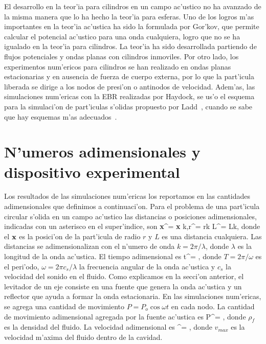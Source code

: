El desarrollo en la teor'ia para cilindros en un campo ac'ustico no ha avanzado de la misma manera
que lo ha hecho la teor'ia para esferas. Uno de los logros m'as importantes en la teor'ia ac'ustica
ha sido la formulada por Gor'kov, que permite calcular el potencial ac'ustico para una onda cualquiera, logro
que no se ha igualado en la teor'ia para cilindros. La  teor'ia ha sido desarrollada partiendo de
flujos potenciales y ondas planas con cilindros inmoviles. Por otro lado, 
los experimentos num'ericos para cilindros se han realizado
en ondas planas estacionarias y en ausencia de fuerza de cuerpo externa, por lo que la part'icula liberada
se dirige a los nodos de presi'on o antinodos de velocidad. Adem'as, las simulaciones num'ericas con la EBR
realizadas por Haydock, se us'o el esquema para la simulaci'on de part'iculas s'olidas propuesto por 
Ladd~\cite{ladd94,ladd94b}, cuando se sabe que hay esquemas m'as adecuados~\cite{aidun98}.
 



\section{N'umeros adimensionales y dispositivo experimental}
\label{sec:adimensionales}

Los  resultados de las simulaciones num'ericas los reportamos en las cantidades adimensionales
que definimos a continuaci'on.
Para el problema de una part'icula circular
s'olida en un campo ac'ustico las distancias o posiciones adimensionales, indicadas con un
asterisco en el super'indice, son
\BE
\textbf x^\ast = \textbf x k,\qquad r^\ast = rk \qquad L^\ast = Lk,
\EE
donde el $\textbf x$ es la posici'on de la part'icula de radio $r$ y $L$ es una
distancia cualquiera. Las distancias se adimensionalizan con el n'umero de onda $k= 2\pi/\lambda$,
donde $\lambda$ es la longitud de la onda ac'ustica. El tiempo adimensional es
\BE
t^\ast = ,
\EE  
donde $T=2\pi/\omega$ es el peri'odo, $\omega=2\pi c_s/\lambda$ la frecuencia angular de la
onda ac'ustica y $c_s$ la velocidad del sonido en el fluido. Como explicamos en la secci'on anterior,
el levitador de un eje consiste en una fuente que genera la onda ac'ustica y un reflector que
ayuda a formar la onda estacionaria.
En las simulaciones num'ericas, se agrega una cantidad de movimiento $P=P_o \cos \omega t$ en cada
nodo. La cantidad de movimiento adimensional agregada por la fuente ac'ustica es
\BE
P^\ast = ,
\EE
donde $\rho_f$ es la densidad del fluido. 
La velocidad adimensional es
\BE
\vu^\ast = ,
\EE
donde $v_{max}$ es la velocidad m'axima del fluido dentro de la cavidad.




